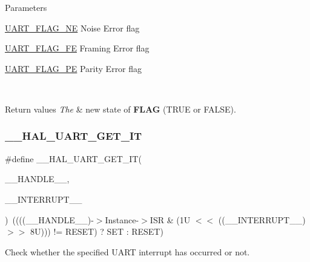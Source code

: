 \begin{DoxyParams}{Parameters}
\begin{DoxyItemize}
\mbox{\hyperlink{group___u_a_r_t___flags_ga665981434d02ff5296361782c1a7d4b5}{U\+A\+R\+T\+\_\+\+F\+L\+A\+G\+\_\+\+NE}} Noise Error flag \item \mbox{\hyperlink{group___u_a_r_t___flags_gafba4891ce21cf5223ca5fede0eac388d}{U\+A\+R\+T\+\_\+\+F\+L\+A\+G\+\_\+\+FE}} Framing Error flag \item \mbox{\hyperlink{group___u_a_r_t___flags_gad5b96f73f6d3a0b58f07e2e9d7bf14d9}{U\+A\+R\+T\+\_\+\+F\+L\+A\+G\+\_\+\+PE}} Parity Error flag \end{DoxyItemize}
\\
\hline
\end{DoxyParams}

\begin{DoxyRetVals}{Return values}
{\em The} & new state of {\bfseries{F\+L\+AG}} (T\+R\+UE or F\+A\+L\+SE). \\
\hline
\end{DoxyRetVals}
\mbox{\label{group___u_a_r_t___exported___macros_ga89c4cb1b623c15cfdea2c0a864c8b1e4}} 
\subsubsection{\texorpdfstring{\_\_HAL\_UART\_GET\_IT}{\_\_HAL\_UART\_GET\_IT}}
{\footnotesize\ttfamily \#define \+\_\+\+\_\+\+H\+A\+L\+\_\+\+U\+A\+R\+T\+\_\+\+G\+E\+T\+\_\+\+IT(\begin{DoxyParamCaption}\item[{}]{\+\_\+\+\_\+\+H\+A\+N\+D\+L\+E\+\_\+\+\_\+,  }\item[{}]{\+\_\+\+\_\+\+I\+N\+T\+E\+R\+R\+U\+P\+T\+\_\+\+\_\+ }\end{DoxyParamCaption})~((((\+\_\+\+\_\+\+H\+A\+N\+D\+L\+E\+\_\+\+\_\+)-\/$>$Instance-\/$>$I\+SR \& (1\+U $<$$<$ ((\+\_\+\+\_\+\+I\+N\+T\+E\+R\+R\+U\+P\+T\+\_\+\+\_\+)$>$$>$ 8\+U))) != R\+E\+S\+E\+T) ? S\+E\+T \+: R\+E\+S\+E\+T)}



Check whether the specified U\+A\+RT interrupt has occurred or not. 


